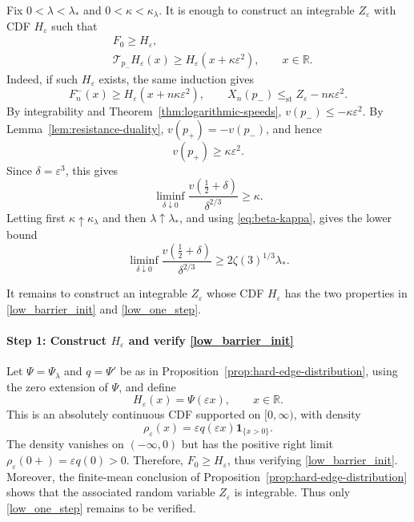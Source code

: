 \documentclass[12pt,preprint]{amsart}
\numberwithin{equation}{section}
\theoremstyle{plain}
\theoremstyle{definition}
\newcommand{\stle}{\le_{\mathrm{st}}}
\begin{document}
Fix $0<\lambda<\lambda_*$ and $0<\kappa<\kappa_{\lambda}$.  It is enough to construct an
integrable \(Z_\varepsilon\) with CDF \(H_\varepsilon\) such that
\begin{align}
 &F_0\ge H_\varepsilon, \label{low_barrier_init}\\
 &\mathcal T_{p_-}H_\varepsilon(x)
 \ge H_\varepsilon(x+\kappa\varepsilon^2),
 \qquad x\in\mathbb R.\label{low_one_step}
\end{align}
Indeed, if such $H_\varepsilon$ exists, the same induction gives
\[
 F_n^-(x)\ge H_\varepsilon(x+n\kappa\varepsilon^2),
 \qquad
 X_n(p_-)\stle Z_\varepsilon-n\kappa\varepsilon^2.
\]
By integrability and Theorem~\ref{thm:logarithmic-speeds},
$v(p_-)\le-\kappa\varepsilon^2$.
By Lemma~\ref{lem:resistance-duality},
$v(p_+)=-v(p_-)$, and hence
\[
 v(p_+)\ge\kappa\varepsilon^2.
\]
Since $\delta=\varepsilon^3$, this gives
\[
 \liminf_{\delta\downarrow0}
 \frac{v(\frac12+\delta)}{\delta^{2/3}}
 \ge\kappa.
\]
Letting first $\kappa\uparrow\kappa_{\lambda}$ and then
$\lambda\uparrow\lambda_*$, and using \eqref{eq:beta-kappa},
gives the lower bound
\begin{equation}
 \liminf_{\delta\downarrow0}
 \frac{v(\frac12+\delta)}{\delta^{2/3}}
 \ge2\zeta(3)^{1/3}\lambda_*.
 \label{eq:sharp-lower-bound}
\end{equation}

It remains to construct an integrable $Z_\varepsilon$ whose CDF
$H_\varepsilon$ has the two properties in \eqref{low_barrier_init} and \eqref{low_one_step}.


\paragraph*{Step 1: Construct $H_\varepsilon$ and verify \eqref{low_barrier_init}}
Let $\Psi=\Psi_{\lambda}$ and $q=\Psi'$ be as in
Proposition~\ref{prop:hard-edge-distribution}, using the zero extension of
$\Psi$, and define
\[
H_\varepsilon(x)=\Psi(\varepsilon x),\qquad x\in\mathbb R.
\]
This is an absolutely continuous CDF supported on $[0,\infty)$,
with density
\[
\rho_\varepsilon(x)
=\varepsilon q(\varepsilon x)\mathbf 1_{\{x>0\}}.
\]
The density vanishes on $(-\infty,0)$
but has the positive right limit
$\rho_\varepsilon(0+)=\varepsilon q(0)>0$.
Therefore, $F_0\ge H_\varepsilon$, thus verifying \eqref{low_barrier_init}.
Moreover, the finite-mean conclusion of
Proposition~\ref{prop:hard-edge-distribution} shows that the associated random
variable $Z_\varepsilon$ is integrable.  Thus only \eqref{low_one_step} remains to be verified.
\end{document}
